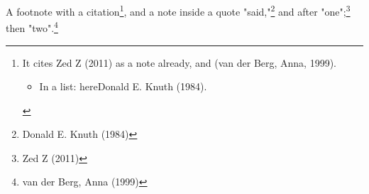 A footnote with a citation\footnote{It cites Zed Z (2011) as a note already, and (van der Berg, Anna, 1999).
\begin{itemize}
\item In a list: hereDonald E. Knuth (1984).
\end{itemize}}, and a note inside a quote "said,"\footnote{Donald E. Knuth (1984)}
and after "one";\footnote{Zed Z (2011)} then "two".\footnote{van der Berg, Anna (1999)}
